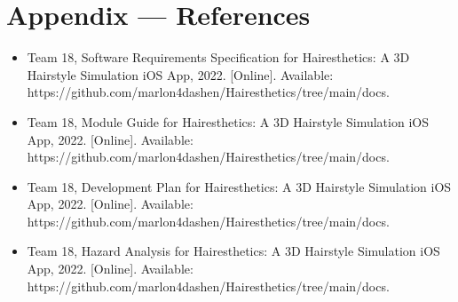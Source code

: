 \documentclass[12pt, titlepage]{article}
\begin{document}
\newpage
\section*{Appendix --- References}

\begin{itemize}
    \item Team 18, Software Requirements Specification for Hairesthetics: A 3D Hairstyle Simulation iOS App, 2022. [Online]. Available: https://github.com/marlon4dashen/Hairesthetics/tree/main/docs.
    \item Team 18, Module Guide for Hairesthetics: A 3D Hairstyle Simulation iOS App, 2022. [Online]. Available: https://github.com/marlon4dashen/Hairesthetics/tree/main/docs.
    \item Team 18, Development Plan for Hairesthetics: A 3D Hairstyle Simulation iOS App, 2022. [Online]. Available: https://github.com/marlon4dashen/Hairesthetics/tree/main/docs.
    \item Team 18, Hazard Analysis for Hairesthetics: A 3D Hairstyle Simulation iOS App, 2022. [Online]. Available: https://github.com/marlon4dashen/Hairesthetics/tree/main/docs.
\end{itemize}
\end{document}
